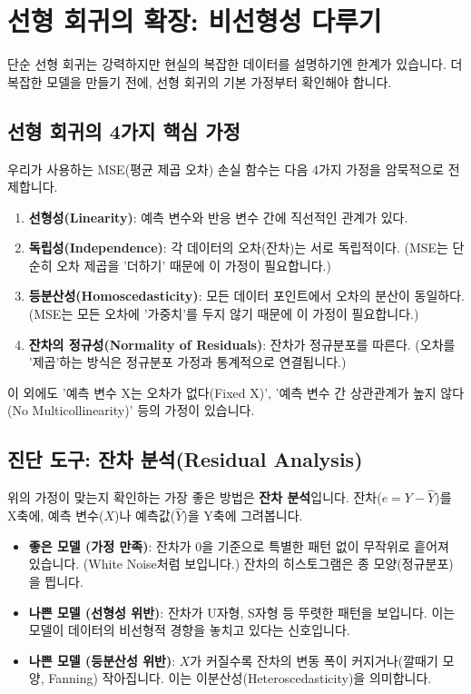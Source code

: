 \documentclass[11pt,a4paper]{book}
\theoremstyle{definition}
\begin{document}
\section{선형 회귀의 확장: 비선형성 다루기}

단순 선형 회귀는 강력하지만 현실의 복잡한 데이터를 설명하기엔 한계가 있습니다. 더 복잡한 모델을 만들기 전에, 선형 회귀의 기본 가정부터 확인해야 합니다.

\subsection{선형 회귀의 4가지 핵심 가정}

우리가 사용하는 MSE(평균 제곱 오차) 손실 함수는 다음 4가지 가정을 암묵적으로 전제합니다.
\begin{enumerate}
    \item \textbf{선형성(Linearity)}: 예측 변수와 반응 변수 간에 직선적인 관계가 있다.
    \item \textbf{독립성(Independence)}: 각 데이터의 오차(잔차)는 서로 독립적이다. (MSE는 단순히 오차 제곱을 '더하기' 때문에 이 가정이 필요합니다.)
    \item \textbf{등분산성(Homoscedasticity)}: 모든 데이터 포인트에서 오차의 분산이 동일하다. (MSE는 모든 오차에 '가중치'를 두지 않기 때문에 이 가정이 필요합니다.)
    \item \textbf{잔차의 정규성(Normality of Residuals)}: 잔차가 정규분포를 따른다. (오차를 '제곱'하는 방식은 정규분포 가정과 통계적으로 연결됩니다.)
\end{enumerate}
이 외에도 '예측 변수 X는 오차가 없다(Fixed X)', '예측 변수 간 상관관계가 높지 않다(No Multicollinearity)' 등의 가정이 있습니다.

\subsection{진단 도구: 잔차 분석(Residual Analysis)}

위의 가정이 맞는지 확인하는 가장 좋은 방법은 \textbf{잔차 분석}입니다. 잔차($e = Y - \hat{Y}$)를 X축에, 예측 변수($X$)나 예측값($\hat{Y}$)을 Y축에 그려봅니다.

\begin{itemize}
    \item \textbf{좋은 모델 (가정 만족)}: 잔차가 0을 기준으로 특별한 패턴 없이 무작위로 흩어져 있습니다. (White Noise처럼 보입니다.) 잔차의 히스토그램은 종 모양(정규분포)을 띕니다.
    \item \textbf{나쁜 모델 (선형성 위반)}: 잔차가 U자형, S자형 등 뚜렷한 패턴을 보입니다. 이는 모델이 데이터의 비선형적 경향을 놓치고 있다는 신호입니다.
    \item \textbf{나쁜 모델 (등분산성 위반)}: $X$가 커질수록 잔차의 변동 폭이 커지거나(깔때기 모양, Fanning) 작아집니다. 이는 이분산성(Heteroscedasticity)을 의미합니다.
\end{itemize}
\end{document}
